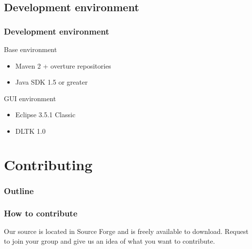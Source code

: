 \subsection{Development environment}
\frame
{
  \frametitle{Development environment}


\begin{block}{Base environment}
  \begin{itemize}
  		\item Maven 2 + overture repositories
  		\item Java SDK 1.5 or greater
  \end{itemize}
\end{block}

\begin{block}{GUI environment}
  \begin{itemize}
  		\item Eclipse 3.5.1 Classic
  		\item DLTK 1.0
  \end{itemize}
\end{block}
}

\section{Contributing}
%
%
\begin{frame}
  \frametitle{Outline}
  \tableofcontents[current]
\end{frame}


\frame
{
  \frametitle{How to contribute}


Our source is located in Source Forge and is freely available to download.
Request to join your group and give us an idea of what you want to contribute.
}

